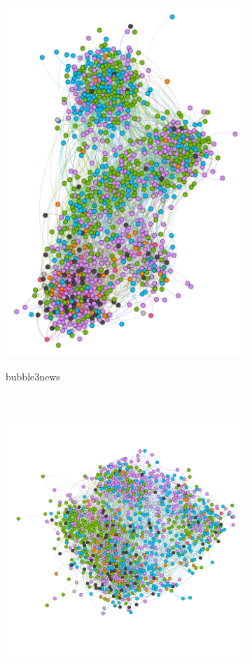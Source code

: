 \begin{figure}
\begin{subfigure}[t]{0.35\textwidth}
    \includegraphics[width=\textwidth]{img/dim5_news.pdf}
    \label{fig:bubble5news}
    \caption{bubble3news}
  \end{subfigure}
  ~
  \begin{subfigure}[t]{0.35\textwidth}
    \includegraphics[width=\textwidth]{img/dim7_news.pdf}

\end{subfigure}
\end{figure}

